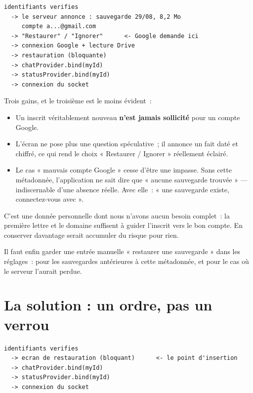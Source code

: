 \documentclass[11pt,a4paper,oneside]{report}
\begin{document}
\begin{lstlisting}[style=Alanya, language={}]
identifiants verifies
  -> le serveur annonce : sauvegarde 29/08, 8,2 Mo
     compte a...@gmail.com
  -> "Restaurer" / "Ignorer"      <- Google demande ici
  -> connexion Google + lecture Drive
  -> restauration (bloquante)
  -> chatProvider.bind(myId)
  -> statusProvider.bind(myId)
  -> connexion du socket
\end{lstlisting}

Trois gains, et le troisième est le moins évident~:

\begin{itemize}[leftmargin=*]
  \item Un inscrit véritablement nouveau \textbf{n'est jamais sollicité} pour un compte
        Google.
  \item L'écran ne pose plus une question spéculative~; il annonce un fait daté et chiffré,
        ce qui rend le choix « Restaurer / Ignorer » réellement éclairé.
  \item Le cas « mauvais compte Google » cesse d'être une impasse. Sans cette métadonnée,
        l'application ne sait dire que « aucune sauvegarde trouvée » --- indiscernable d'une
        absence réelle. Avec elle~: « une sauvegarde existe, connectez-vous avec
         ».
\end{itemize}

\begin{alerte}
C'est une donnée personnelle dont nous n'avons aucun besoin complet~: la première lettre et
le domaine suffisent à guider l'inscrit vers le bon compte. En conserver davantage serait
accumuler du risque pour rien.
\end{alerte}

Il faut enfin garder une entrée manuelle « restaurer une sauvegarde » dans les réglages~:
pour les sauvegardes antérieures à cette métadonnée, et pour le cas où le serveur l'aurait
perdue.

\section{La solution : un ordre, pas un verrou}

\begin{lstlisting}[style=Alanya, language={}]
identifiants verifies
  -> ecran de restauration (bloquant)      <- le point d'insertion
  -> chatProvider.bind(myId)
  -> statusProvider.bind(myId)
  -> connexion du socket
\end{lstlisting}
\end{document}
